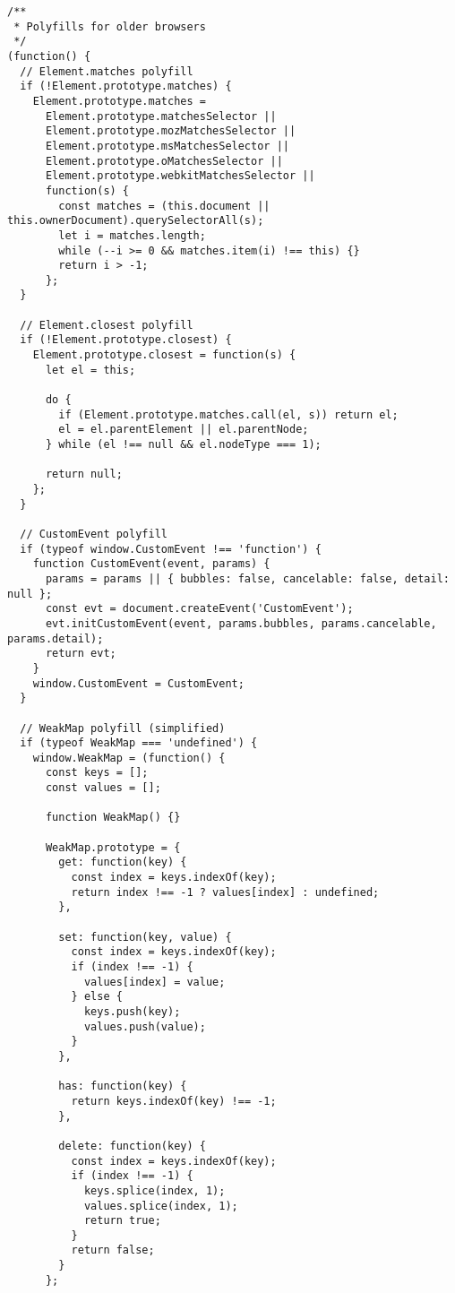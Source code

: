 \documentclass[11pt]{article}
\begin{document}
\begin{verbatim}
/**
 * Polyfills for older browsers
 */
(function() {
  // Element.matches polyfill
  if (!Element.prototype.matches) {
    Element.prototype.matches =
      Element.prototype.matchesSelector ||
      Element.prototype.mozMatchesSelector ||
      Element.prototype.msMatchesSelector ||
      Element.prototype.oMatchesSelector ||
      Element.prototype.webkitMatchesSelector ||
      function(s) {
        const matches = (this.document || this.ownerDocument).querySelectorAll(s);
        let i = matches.length;
        while (--i >= 0 && matches.item(i) !== this) {}
        return i > -1;
      };
  }
  
  // Element.closest polyfill
  if (!Element.prototype.closest) {
    Element.prototype.closest = function(s) {
      let el = this;
      
      do {
        if (Element.prototype.matches.call(el, s)) return el;
        el = el.parentElement || el.parentNode;
      } while (el !== null && el.nodeType === 1);
      
      return null;
    };
  }
  
  // CustomEvent polyfill
  if (typeof window.CustomEvent !== 'function') {
    function CustomEvent(event, params) {
      params = params || { bubbles: false, cancelable: false, detail: null };
      const evt = document.createEvent('CustomEvent');
      evt.initCustomEvent(event, params.bubbles, params.cancelable, params.detail);
      return evt;
    }
    window.CustomEvent = CustomEvent;
  }
  
  // WeakMap polyfill (simplified)
  if (typeof WeakMap === 'undefined') {
    window.WeakMap = (function() {
      const keys = [];
      const values = [];
      
      function WeakMap() {}
      
      WeakMap.prototype = {
        get: function(key) {
          const index = keys.indexOf(key);
          return index !== -1 ? values[index] : undefined;
        },
        
        set: function(key, value) {
          const index = keys.indexOf(key);
          if (index !== -1) {
            values[index] = value;
          } else {
            keys.push(key);
            values.push(value);
          }
        },
        
        has: function(key) {
          return keys.indexOf(key) !== -1;
        },
        
        delete: function(key) {
          const index = keys.indexOf(key);
          if (index !== -1) {
            keys.splice(index, 1);
            values.splice(index, 1);
            return true;
          }
          return false;
        }
      };
      

\end{verbatim}
\end{document}
